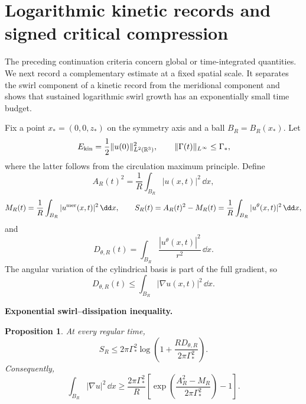 \documentclass[11pt]{article}
\newtheorem{proposition}[theorem]{Proposition}
\theoremstyle{definition}\newtheorem{definition}[theorem]{Definition}
\theoremstyle{remark}\newtheorem{remark}[theorem]{Remark}
\begin{document}
\section{Logarithmic kinetic records and signed critical compression}
\label{sec:log-records}

The preceding continuation criteria concern global or time-integrated
quantities.  We next record a complementary estimate at a fixed spatial scale.
It separates the swirl component of a kinetic record from the meridional
component and shows that sustained logarithmic swirl growth has an
exponentially small time budget.

Fix a point \(x_*=(0,0,z_*)\) on the symmetry axis and a ball \(B_R=B_R(x_*)\).
Let
\[
 E_{\rm kin}=\frac12\|u(0)\|_{L^2(\mathbb R^3)}^2,
 \qquad
 \|\Gamma(t)\|_{L^\infty}\le\Gamma_*,
\]
where the latter follows from the circulation maximum principle.  Define
\[
 A_R(t)^2=\frac1R\int_{B_R}|u(x,t)|^2\,\dd x,
\]
\[
 M_R(t)=\frac1R\int_{B_R}|u^{\rm mer}(x,t)|^2\,\dd x,
 \qquad
 S_R(t)=A_R(t)^2-M_R(t)
       =\frac1R\int_{B_R}|u^\theta(x,t)|^2\,\dd x,
\]
and
\[
 D_{\theta,R}(t)=\int_{B_R}\frac{|u^\theta(x,t)|^2}{r^2}\,\dd x.
\]
The angular variation of the cylindrical basis is part of the full gradient,
so
\[
 D_{\theta,R}(t)\le\int_{B_R}|\nabla u(x,t)|^2\,\dd x.
\]

\medskip
\noindent\textbf{Exponential swirl--dissipation inequality.}
\begin{proposition}\label{prop:swirl-exp-diss}
At every regular time,
\begin{equation}\label{eq:swirl-exp-bound}
 \boxed{
 S_R
 \le
 2\pi\Gamma_*^2
 \log\!\left(
 1+\frac{R D_{\theta,R}}{2\pi\Gamma_*^2}
 \right).
 }
\end{equation}
Consequently,
\begin{equation}\label{eq:swirl-diss-lower}
 \boxed{
 \int_{B_R}|\nabla u|^2\,\dd x
 \ge
 \frac{2\pi\Gamma_*^2}{R}
 \left[
 \exp\!\left(
 \frac{A_R^2-M_R}{2\pi\Gamma_*^2}
 \right)-1
 \right].
 }
\end{equation}
\end{proposition}
\end{document}
